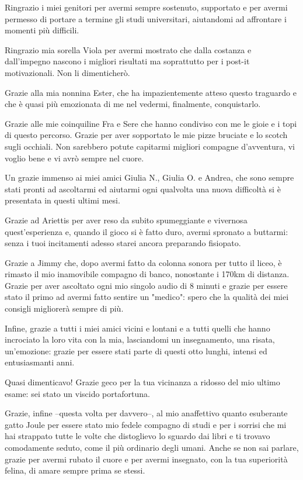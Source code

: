 \bigskip \noindent
Ringrazio i miei genitori per avermi sempre sostenuto, supportato e per avermi permesso di portare a termine gli studi universitari, aiutandomi ad affrontare i momenti più difficili. 

\bigskip \noindent
Ringrazio mia sorella Viola per avermi mostrato che dalla costanza e dall'impegno nascono i migliori risultati ma soprattutto per i post-it motivazionali. Non li dimenticherò. 

\bigskip \noindent
Grazie alla mia nonnina Ester, che ha impazientemente atteso questo traguardo e che è quasi più emozionata di me nel vedermi, finalmente, conquistarlo.

\bigskip \noindent
Grazie alle mie coinquiline Fra e Sere che hanno condiviso con me le gioie e i topi di questo percorso. Grazie per aver sopportato le mie pizze bruciate e lo scotch sugli occhiali. Non sarebbero potute capitarmi migliori compagne d'avventura, vi voglio bene e vi avrò sempre nel cuore. 

\bigskip \noindent
Un grazie immenso ai miei amici Giulia N., Giulia O. e Andrea, che sono sempre stati pronti ad ascoltarmi ed aiutarmi ogni qualvolta una nuova difficoltà si è presentata in questi ultimi mesi.

\bigskip \noindent
Grazie ad Ariettis per aver reso da subito spumeggiante e vivernosa quest'esperienza e, quando il gioco si è fatto duro, avermi spronato a buttarmi: senza i tuoi incitamenti adesso starei ancora preparando fisiopato.

\bigskip \noindent
Grazie a Jimmy che, dopo avermi fatto da colonna sonora per tutto il liceo, è rimasto il mio inamovibile compagno di banco, nonostante i 170km di distanza. Grazie per aver ascoltato ogni mio singolo audio di 8 minuti e grazie per essere stato il primo ad avermi fatto sentire un "medico": spero che la qualità dei miei consigli migliorerà sempre di più. 

\bigskip\noindent
Infine, grazie a tutti i miei amici vicini e lontani e a tutti quelli che hanno incrociato la loro vita con la mia, lasciandomi un insegnamento, una risata, un'emozione: grazie per essere stati parte di questi otto lunghi, intensi ed entusiasmanti anni.

\bigskip\noindent
Quasi dimenticavo! Grazie geco per la tua vicinanza a ridosso del mio ultimo esame: sei stato un viscido portafortuna. 

\bigskip\noindent
Grazie, infine --questa volta per davvero--, al mio anaffettivo quanto esuberante gatto Joule per essere stato mio fedele compagno di studi e per i sorrisi che mi hai strappato tutte le volte che distoglievo lo sguardo dai libri e ti trovavo comodamente seduto, come il più ordinario degli umani. Anche se non sai parlare, grazie per avermi rubato il cuore e per avermi insegnato, con la tua superiorità felina, di amare sempre prima se stessi.  